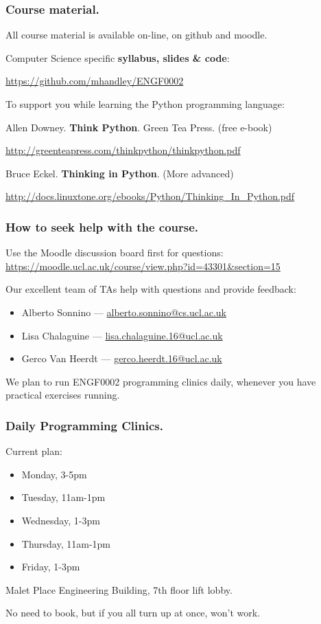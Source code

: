 \documentclass{beamer} %
\newcommand\emc[1]{\textcolor{midred}{\textbf{#1}}}
\begin{document}
\begin{frame}
\frametitle{Course material.} 

All course material is available on-line, on github and moodle.

\vspace{7mm}
Computer Science specific \emc{syllabus, slides \& code}: 

\url{https://github.com/mhandley/ENGF0002}

\vspace{7mm}
To support you while learning the Python programming language:

\vspace{2mm}
Allen Downey. \emc{Think Python}. Green Tea Press. (free e-book)

{\small \url{http://greenteapress.com/thinkpython/thinkpython.pdf} }

\vspace{2mm}
Bruce Eckel. \emc{Thinking in Python}. (More advanced)

{\small \url{http://docs.linuxtone.org/ebooks/Python/Thinking_In_Python.pdf} }


\end{frame}

\begin{frame}
\frametitle{How to seek help with the course.} 

Use the Moodle discussion board first for questions: 
\url{https://moodle.ucl.ac.uk/course/view.php?id=43301&section=15}

\vspace{3mm}
Our excellent team of TAs help with questions and provide feedback:
\begin{itemize}
\item Alberto Sonnino --- \url{alberto.sonnino@cs.ucl.ac.uk}
\item Lisa Chalaguine --- \url{lisa.chalaguine.16@ucl.ac.uk}
\item Gerco Van Heerdt --- \url{gerco.heerdt.16@ucl.ac.uk}
\end{itemize}

We plan to run ENGF0002 programming clinics daily, whenever you have practical
exercises running.
\end{frame}

\begin{frame}
  \frametitle{Daily Programming Clinics.}

  Current plan:
  \begin{itemize}
  \item Monday, 3-5pm
  \item Tuesday, 11am-1pm
  \item Wednesday, 1-3pm
  \item Thursday, 11am-1pm
  \item Friday, 1-3pm
  \end{itemize}

  Malet Place Engineering Building, 7th floor lift lobby.

  No need to book, but if you all turn up at once, won't work.
\end{frame}
\end{document}
